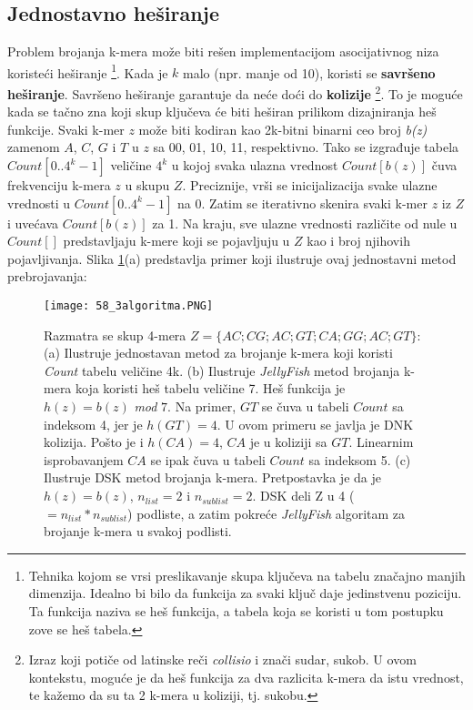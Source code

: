 \documentclass[12pt,oneside]{memoir}
\begin{document}
\subsection{Jednostavno heširanje}
Problem brojanja k-mera može biti rešen implementacijom asocijativnog niza koristeći heširanje \footnote{Tehnika kojom se vrsi preslikavanje skupa ključeva na tabelu značajno manjih dimenzija. Idealno bi bilo da funkcija za svaki ključ
daje jedinstvenu poziciju. Ta funkcija naziva se heš funkcija, a tabela koja se koristi u tom
postupku zove se heš tabela.}. Kada je $k$ malo (npr. manje od 10), koristi se \textbf{savršeno heširanje}. Savršeno heširanje garantuje da neće doći do \textbf{kolizije}  \footnote{Izraz koji potiče od latinske reči \textit{collisio} i znači sudar, sukob. U ovom kontekstu, moguće je da heš funkcija za dva razlicita k-mera da istu vrednost, te kažemo da su ta 2 k-mera u koliziji, tj. sukobu.}. To je moguće kada se tačno zna koji skup ključeva će biti heširan prilikom dizajniranja heš funkcije. Svaki k-mer $z$ može biti kodiran kao 2k-bitni binarni ceo broj \textit{b(z)} zamenom $A$, $C$, $G$ i $T$ u $z$ sa 00, 01, 10, 11, respektivno. Tako se izgrađuje tabela $Count[0..4^k - 1]$ veličine $4^k$ u kojoj svaka ulazna vrednost $Count[b(z)]$ čuva frekvenciju k-mera $z$ u skupu $Z$. Preciznije, vrši se inicijalizacija svake ulazne vrednosti u $Count[0..4^k - 1]$ na 0. Zatim se iterativno skenira svaki k-mer $z$ iz $Z$ i uvećava $Count[b(z)]$ za 1. Na kraju, sve ulazne vrednosti različite od nule u $Count[]$ predstavljaju k-mere koji se pojavljuju u $Z$ kao i broj njihovih pojavljivanja. Slika \ref{fig:5}(a) predstavlja primer koji ilustruje ovaj jednostavni metod prebrojavanja:

\begin{figure}[!ht]
  \centering
  \texttt{[image: 58\_3algoritma.PNG]}
  \caption{Razmatra se skup 4-mera $Z = \{AC; CG; AC; GT; CA; GG; AC; GT\}$: (a) Ilustruje jednostavan metod za brojanje k-mera koji koristi \textit{Count} tabelu veličine 4k. (b) Ilustruje \textit{JellyFish} metod brojanja k-mera koja koristi heš tabelu veličine 7. Heš funkcija je $h(z) = b(z)$ \textit{mod} $7$. Na primer, $GT$ se čuva u tabeli $Count$ sa indeksom 4, jer je $h(GT) = 4$. U ovom primeru se javlja je DNK kolizija. Pošto je i $h(CA) = 4$, $CA$ je u koliziji sa $GT$. Linearnim isprobavanjem $CA$ se ipak čuva u tabeli $Count$ sa indeksom 5. (c) Ilustruje DSK metod brojanja k-mera.
Pretpostavka je da je $h(z) = b(z)$, $n_{list} = 2$ i $n_{sublist} = 2$. DSK deli Z u
4 ($= n_{list} * n_{sublist}$) podliste, a zatim pokreće \textit{JellyFish} algoritam za brojanje k-mera u svakoj podlisti.}
  \label{fig:5}
\end{figure}
\end{document}
